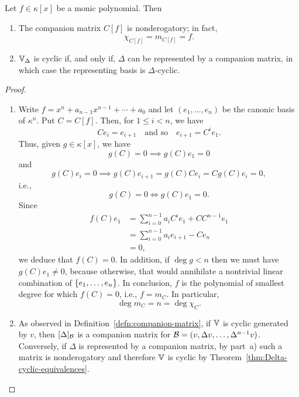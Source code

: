 \begin{thm}
    Let\/ $f\in\kappa[x]$ be a monic polynomial. Then
    \begin{enumerate}[\rm a)]
        \item The companion matrix $C[f]$ is nonderogatory; in fact,
        $$
            \chi_{C[f]} = m_{C[f]} = f.
        $$
        
        \item $\mathbb V_\Delta$ is cyclic if, and only if, $\Delta$ can be represented by a companion matrix, in which case the representing basis is $\Delta$-cyclic.
    \end{enumerate}
\end{thm}

\begin{proof}${}$
    \begin{enumerate}[\rm a)]
        \item Write $f=x^n+a_{n-1}x^{n-1}+\cdots+a_0$ and let $(e_1,\dots,e_n)$ be the canonic basis of $\kappa^n$. Put $C=C[f]$. Then, for $1\le i<n$, we have
        $$
            Ce_i=e_{i+1}
            \quad\text{and so}\quad
            e_{i+1} = C^ie_1.
        $$
        Thus, given $g\in\kappa[x]$, we have
        $$
            g(C)=0\implies g(C)e_1=0
        $$
        and
        $$
            g(C)e_i=0
                \implies g(C)e_{i+1}=g(C)Ce_i=Cg(C)e_i=0,
        $$
        i.e.,
        $$
            g(C)=0\iff g(C)e_1=0.
        $$
        Since
        \begin{align*}
            f(C)e_1 &= \sum_{i=0}^{n-1}a_iC^ie_1
                    +CC^{n-1}e_1\\
                &= \sum_{i=0}^{n-1}a_ie_{i+1}-Ce_n\\
                &= 0,
        \end{align*}
        we deduce that $f(C)=0$. In addition, if $\deg g<n$ then we must have $g(C)e_1\ne0$, because otherwise, that would annihilate a nontrivial linear combination of $\{e_1,\dots,e_n\}$. In conclusion, $f$ is the polynomial of smallest degree for which $f(C)=0$, i.e., $f=m_C$. In particular,
        $$
            \deg m_C=n=\deg\chi_C.
        $$

        \item As observed in Definition~\ref{defn:companion-matrix}, if $\mathbb V$ is cyclic generated by $v$, then $[\Delta]_{\mathcal B}$ is a companion matrix for $\mathcal B=(v,\Delta v,\dots,\Delta^{n-1}v)$. Conversely, if $\Delta$ is represented by a companion matrix, by part~a) such a matrix is nonderogatory and therefore $\mathbb V$ is cyclic by Theorem~\ref{thm:Delta-cyclic-equivalences}.
    \end{enumerate}
\end{proof}

